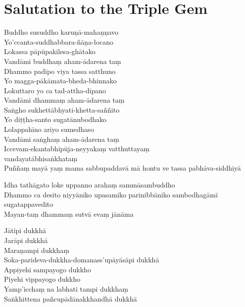 \clearpage

\section*{Salutation to the Triple Gem}

\begin{leader}
\end{leader}


Buddho susuddho karuṇā-mahaṇṇavo\\
Yo'ccanta-suddhabbara-ñāṇa-locano\\
Lokassa pāpūpakilesa-ghātako\\
Vandāmi buddhaṃ aham-ādarena taṃ\\
Dhammo padīpo viya tassa satthuno\\
Yo magga-pākāmata-bheda-bhinnako\\
Lokuttaro yo ca tad-attha-dīpano\\
Vandāmi dhammaṃ aham-ādarena taṃ\\
Saṅgho sukhettābhyati-khetta-saññito\\
Yo diṭṭha-santo sugatānubodhako\\
Lolappahīno ariyo sumedhaso\\
Vandāmi saṅghaṃ aham-ādarena taṃ\\
Iccevam-ekantabhipūja-neyyakaṃ vatthuttayaṃ \\vandayatābhisaṅkhataṃ\\
Puññaṃ mayā yaṃ mama sabbupaddavā mā hontu ve tassa pabhāva-siddhiyā

Idha tathāgato loke uppanno arahaṃ sammāsambuddho\\
Dhammo ca desito niyyāniko upasamiko parinibbāniko sambodhagāmī sugatappavedito\\
Mayan-taṃ dhammaṃ sutvā evaṃ jānāma

\clearpage

Jātipi dukkhā\\
Jarāpi dukkhā\\
Maraṇampi dukkhaṃ\\
Soka-parideva-dukkha-domanass'upāyāsāpi dukkhā\\
Appiyehi sampayogo dukkho\\
Piyehi vippayogo dukkho\\
Yamp'icchaṃ na labhati tampi dukkhaṃ\\
Saṅkhittena pañcupādānakkhandhā dukkhā

